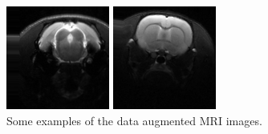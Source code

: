 \begin{figure}[ht]
\begin{minipage}[b]{0.5\linewidth}
  \end{minipage} 
  \begin{minipage}[b]{0.5\linewidth}
    \centering
    \includegraphics[width=\linewidth]{3.png} 
  \end{minipage}
  \hfill
  \begin{minipage}[b]{0.5\linewidth}
    \centering
    \includegraphics[width=\linewidth]{9.png} 
  \end{minipage} 
  \caption{Some examples of the data augmented MRI images. }
  \label{fig:dataAugImage} 
\end{figure}

